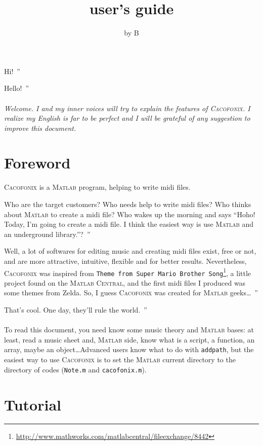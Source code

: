 \documentclass{article}
\title{\cacofonix user's guide}
\author{by B}
\date{}
\newcommand{\cacofonix}{\textsc{Cacofonix}\xspace}
\newcommand{\matlab}{\textsc{Matlab}\xspace}
\newcommand{\file}[1]{\texttt{#1}\xspace}
\newcommand{\noteFile}{\file{Note.m}}
\newcommand{\cacofonixFile}{\file{cacofonix.m}}
\newcommand{\exchange}[2]{\texttt{#1}\footnote{\url{#2}}\xspace}
\newenvironment{meenv}{ \par \noindent \makebox[6em][r]{ \textcolor{mecolor}{Me}: `` --~}}{~''}
\newenvironment{myselfenv}{ \par \noindent \makebox[6em][r]{ \textcolor{myselfcolor}{Myself}: `` --~}}{~''}
\newcommand{\me}[1]{\begin{meenv}#1\end{meenv}}
\newcommand{\myself}[1]{\begin{myselfenv}#1\end{myselfenv}}
\begin{document}
\maketitle

\me{Hi!}
\myself{Hello!}

\paragraph{}

\emph{Welcome. I and my inner voices will try to explain the features of \cacofonix. I realize my English is far to be perfect and I will be grateful of any suggestion to improve this document.}

\tableofcontents

\section{Foreword}

\cacofonix is a \matlab program, helping to write midi files.

\me{Who are the target customers? Who needs help to write midi files? Who thinks about \matlab to create a midi file? Who wakes up the morning and says ``Hoho! Today, I'm going to create a midi file. I think the easiest way is use \matlab and an underground library.''?}
\myself{Well, a lot of softwares for editing music and creating midi files exist, free or not, and are more attractive, intuitive, flexible and for better results. Nevertheless, \cacofonix was inspired from \exchange{Theme from Super Mario Brother Song}{http://www.mathworks.com/matlabcentral/fileexchange/8442}, a little project found on the \textsc{Matlab Central}, and the first midi files I produced was some themes from Zelda. So, I guess \cacofonix was created for \matlab geeks\dots}
\me{That's cool. One day, they'll rule the world.}

\paragraph{}

To read this document, you need know some music theory and \matlab bases: at least, read a music sheet and, \matlab side, know what is a script, a function, an array, maybe an object\dots Advanced users know what to do with \lstinline!addpath!, but the easiest way to use \cacofonix is to set the \matlab current directory to the directory of codes (\noteFile and \cacofonixFile).

\section{Tutorial}
\end{document}
